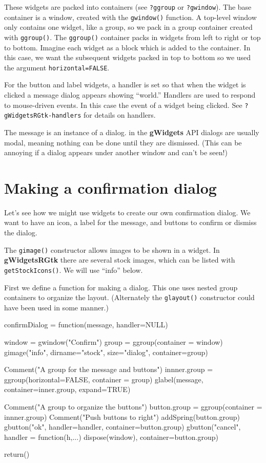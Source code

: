 \documentclass[12pt]{article}
\newcommand{\RCode}[1]{\texttt{#1}}
\newcommand{\RFunc}[1]{\texttt{#1()}}
\newcommand{\RPackage}[1]{\textbf{#1}}
\begin{document}
These widgets are packed into containers (see \RCode{?ggroup} or
\RCode{?gwindow}). The base container is a window, created with the
\RFunc{gwindow} function. A top-level window only contains one widget,
like a group, so we pack in a group container created with
\RFunc{ggroup}. The \RFunc{ggroup} container packs in widgets from
left to right or top to bottom. Imagine each widget as a block which
is added to the container.  In this case, we want the subsequent
widgets packed in top to bottom so we used the argument
\RCode{horizontal=FALSE}.

For the button and label widgets, a  handler is set so that when the widget is
clicked a message dialog appears showing ``world.'' Handlers are used
to respond to mouse-driven events. In this case the event of a widget
being clicked. See \RCode{?gWidgetsRGtk-handlers} for details on
handlers. 

The message is an instance of a dialog. in the \RPackage{gWidgets} API
dialogs are usually modal, meaning nothing can be done until they are
dismissed. (This can be annoying if a dialog appears under another
window and can't be seen!)


\section{Making a confirmation dialog}

Let's see how we might use widgets to create our own confirmation
dialog. We want to have an icon, a label for the message, and  buttons
to confirm or dismiss the dialog.

The \RFunc{gimage} constructor allows images to be shown in a
widget. In \RPackage{gWidgetsRGtk} there are several stock images, which can be
listed with \RFunc{getStockIcons}. We will use ``info'' below.

First we define a function for making a dialog. This one uses
nested group containers to organize the layout. (Alternately the
\RFunc{glayout} constructor could have been used in some manner.)

\begin{Scode}
  confirmDialog = function(message, handler=NULL)  {
  window = gwindow("Confirm")
  group = ggroup(container = window)
  gimage("info", dirname="stock", size="dialog", container=group)

  Comment("A group for the message and buttons")
  innner.group = ggroup(horizontal=FALSE, container = group)
  glabel(message, container=inner.group, expand=TRUE)

  Comment("A group to organize the buttons") 
  button.group = ggroup(container = innner.group)
  Comment("Push buttons to right")
  addSpring(button.group)
  gbutton("ok", handler=handler, container=button.group)
  gbutton("cancel", handler = function(h,...) dispose(window),
          container=button.group)
  
  return()
}
\end{Scode}
\end{document}
